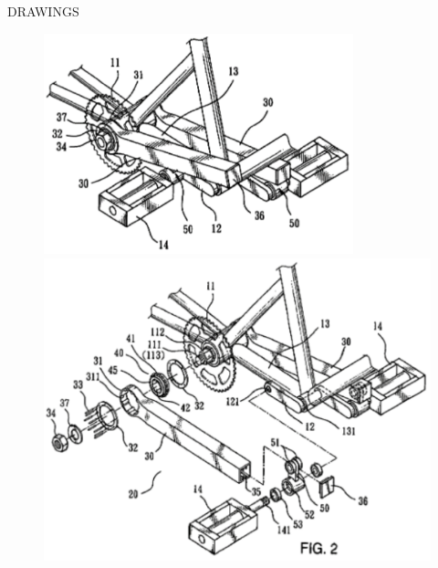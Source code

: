 \documentclass[10pt, a4paper]{article}
\newcommand{\mydrawings}[1]{
	\begin{center}
		DRAWINGS
	\end{center}	
	#1
}
\begin{document}
	
	\mydrawings{
		\begin{figure}[!h]
			\begin{minipage}{0.49\textwidth}
				\centering
				\includegraphics[width=0.8\textwidth]{figures/fig1.png}
				\caption{}
			\end{minipage}
			\begin{minipage}{0.49\textwidth}
				\centering
				\includegraphics[width=\textwidth]{figures/fig2.png}
				\caption{}
			\end{minipage}
		\end{figure}
	
}
\end{document}
